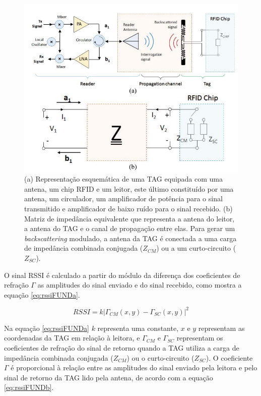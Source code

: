 \begin{figure}[H]
    \centering
    \includegraphics[width=0.8\linewidth]{figs/Fundamentos/rssi.PNG}
    \caption{(a) Representação esquemática de uma TAG equipada com uma antena, um chip RFID e um leitor, este último constituído por uma antena, um circulador, um amplificador de potência para o sinal transmitido e amplificador de baixo ruído para o sinal recebido. (b) Matriz de impedância equivalente que representa a antena do leitor, a antena do TAG e o canal de propagação entre elas. Para gerar um \textit{backscattering} modulado, a antena da TAG é conectada a uma carga de impedância combinada conjugada ($Z_{CM}$) ou a um curto-circuito ($Z_{SC}$). \cite{buffi2018rssi}}
    \label{fig:rssiFUND}
\end{figure}

O sinal RSSI é calculado a partir do módulo da diferença dos coeficientes de refração $\Gamma$ as amplitudes do sinal enviado e do sinal recebido, como mostra a equação \ref{eq:rssiFUNDa}. 

\begin{equation}
    RSSI = k {|\Gamma_{CM}(x,y) - \Gamma_{SC}(x,y)|}^2
    \label{eq:rssiFUNDa}
\end{equation}

Na equação \ref{eq:rssiFUNDa} $k$ representa uma constante, $x$ e $y$ representam as coordenadas da TAG em relação à leitora, e $\Gamma_{CM}$ e $\Gamma_{SC}$ representam os coeficientes de refração do sinal de retorno quando a TAG utiliza a carga de impedância combinada conjugada ($Z_{CM}$) ou o curto-circuito ($Z_{SC}$). O coeficiente $\Gamma$ é proporcional à relação entre as amplitudes do sinal enviado pela leitora e pelo sinal de retorno da TAG lido pela antena, de acordo com a equação \ref{eq:rssiFUNDb}.

